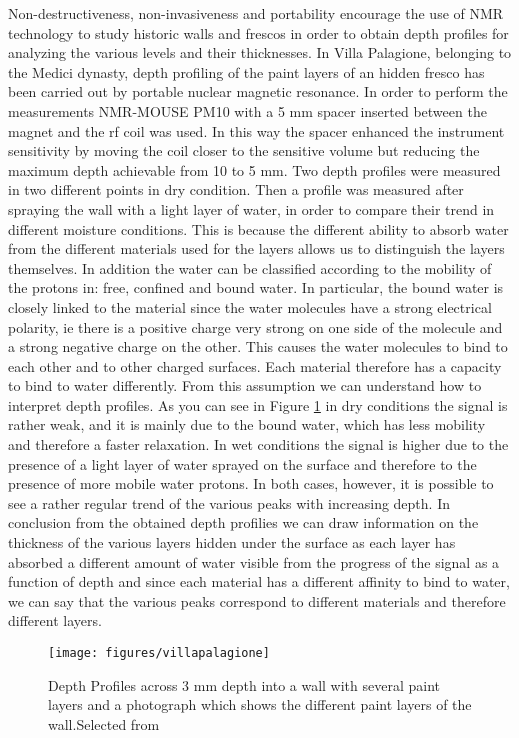 \documentclass[a4paper,11pt]{report}
\begin{document}
Non-destructiveness, non-invasiveness and portability encourage the use of NMR technology to study historic walls and frescos in order to obtain depth profiles for analyzing the various levels and their thicknesses. In Villa Palagione, belonging to the Medici dynasty, depth profiling of the paint layers of an hidden fresco has been carried out by portable nuclear magnetic resonance\cite{cinquefresco}.
In order to perform the measurements NMR-MOUSE PM10 with a 5 mm spacer inserted between the magnet and the rf coil was used.
In this way the spacer enhanced the instrument sensitivity by moving the coil closer to the sensitive volume but reducing the maximum depth achievable from 10 to 5 mm. 
Two depth profiles were measured in two different points in dry condition. Then a profile was measured after spraying the wall with a light layer of water, in order to compare their trend in different moisture conditions. 
This is because the different ability to absorb water from the different materials used for the layers allows us to distinguish the layers themselves. In addition the water can be classified according to the mobility of the protons in: free, confined and bound water. In particular, the bound water is closely linked to the material since the water molecules have a strong electrical polarity, ie there is a positive charge very strong on one side of the molecule and a strong negative charge on the other. This causes the water molecules to bind to each other and to other charged surfaces. Each material therefore has a capacity to bind to water differently. From this assumption we can understand how to interpret depth profiles. 
As you can see in Figure \ref{villapalagione} in dry conditions the signal is rather weak, and it is mainly due to the bound water, which has less mobility and therefore a faster relaxation. In wet conditions the signal is higher due to the presence of a light layer of water sprayed on the surface and therefore to the presence of more mobile water protons. In both cases, however, it is possible to see a rather regular trend of the various peaks with increasing depth. In conclusion from the obtained depth profilies we can draw information on the thickness of the various layers hidden under the surface as each layer has absorbed a different amount of water visible from the progress of the signal as a function of depth and since each material has a different affinity to bind to water, we can say that the various peaks correspond to different materials and therefore different layers. 
\begin{figure}[h]
	\centering
	\texttt{[image: figures/villapalagione]}
	\caption{Depth Profiles across 3 mm depth into a wall with several paint layers and a photograph which shows the different paint layers of the wall.Selected from \cite{cinquefresco}} \label{villapalagione}
\end{figure}
\end{document}
